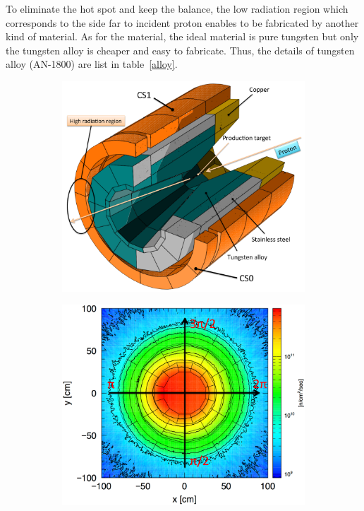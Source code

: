 To eliminate the hot spot and keep the balance, the low radiation region which corresponds to the side far to incident proton enables to be fabricated by another kind of material.
As for the material, the ideal material is pure tungsten but only the tungsten alloy is cheaper and easy to fabricate.
Thus, the details of tungsten alloy (AN-1800) are list in table~\ref{alloy}.
 \begin{figure}[H]
  \begin{subfigure}{0.3\textwidth}
   \centering
   \includegraphics[scale=0.3]{chapter3/fig/shielding.pdf}
  \end{subfigure}
  \hspace{0.2\textwidth}
  \begin{subfigure}{0.3\textwidth}
   \centering
   \includegraphics[scale=0.3]{chapter3/fig/shieldflux.pdf}

\end{subfigure}
\end{figure}

